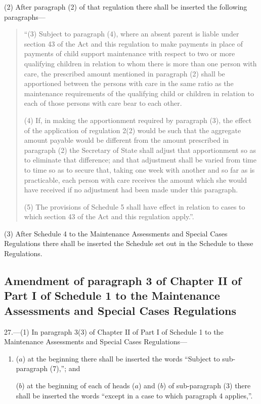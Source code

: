\documentclass[a4paper]{article}
\begin{document}
(2) After paragraph (2) of that regulation there shall be inserted the following paragraphs---
\begin{quotation}
“(3) Subject to paragraph (4), where an absent parent is liable under section 43 of the Act and this regulation to make payments in place of payments of child support maintenance with respect to two or more qualifying children in relation to whom there is more than one person with care, the prescribed amount mentioned in paragraph (2) shall be apportioned between the persons with care in the same ratio as the maintenance requirements of the qualifying child or children in relation to each of those persons with care bear to each other.

(4) If, in making the apportionment required by paragraph (3), the effect of the application of regulation 2(2) would be such that the aggregate amount payable would be different from the amount prescribed in paragraph (2) the Secretary of State shall adjust that apportionment so as to eliminate that difference; and that adjustment shall be varied from time to time so as to secure that, taking one week with another and so far as is practicable, each person with care receives the amount which she would have received if no adjustment had been made under this paragraph.

(5) The provisions of Schedule 5 shall have effect in relation to cases to which section 43 of the Act and this regulation apply.”.
\end{quotation}

(3) After Schedule 4 to the Maintenance Assessments and Special Cases Regulations there shall be inserted the Schedule set out in the Schedule to these Regulations.

\subsection[27. Amendment of paragraph 3 of Chapter II of Part I of Schedule 1 to the Maintenance Assessments and Special Cases Regulations]{Amendment of paragraph 3 of Chapter II of Part I of Schedule 1 to the Maintenance Assessments and Special Cases Regulations}

27.—(1) In paragraph 3(3) of Chapter II of Part I of Schedule 1 to the Maintenance Assessments and Special Cases Regulations---
\begin{enumerate}\item[]
($a$) at the beginning there shall be inserted the words “Subject to sub-paragraph (7),”; and

($b$) at the beginning of each of heads ($a$) and ($b$) of sub-paragraph (3) there shall be inserted the words “except in a case to which paragraph 4 applies,”.
\end{enumerate}
\end{document}

